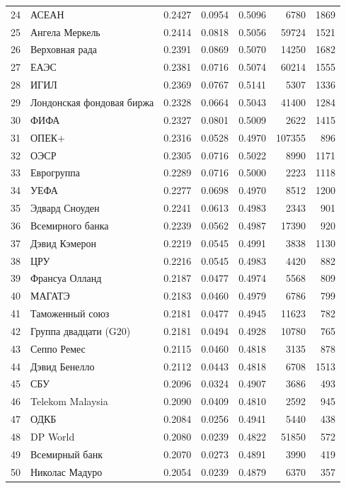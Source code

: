 {\begin{longtable}{r >{\raggedright\arraybackslash}p{4.2cm} S[table-format=1.4] S[table-format=1.4] S[table-format=1.4] r r}
24 & АСЕАН & 0.2427 & 0.0954 & 0.5096 & 6780 & 1869 \\
25 & Ангела Меркель & 0.2414 & 0.0818 & 0.5056 & 59724 & 1521 \\
26 & Верховная рада & 0.2391 & 0.0869 & 0.5070 & 14250 & 1682 \\
27 & ЕАЭС & 0.2381 & 0.0716 & 0.5074 & 60214 & 1555 \\
28 & ИГИЛ & 0.2369 & 0.0767 & 0.5141 & 5307 & 1336 \\
29 & Лондонская фондовая биржа & 0.2328 & 0.0664 & 0.5043 & 41400 & 1284 \\
30 & ФИФА & 0.2327 & 0.0801 & 0.5009 & 2622 & 1415 \\
31 & ОПЕК+ & 0.2316 & 0.0528 & 0.4970 & 107355 & 896 \\
32 & ОЭСР & 0.2305 & 0.0716 & 0.5022 & 8990 & 1171 \\
33 & Еврогруппа & 0.2289 & 0.0716 & 0.5000 & 2223 & 1118 \\
34 & УЕФА & 0.2277 & 0.0698 & 0.4970 & 8512 & 1200 \\
35 & Эдвард Сноуден & 0.2241 & 0.0613 & 0.4983 & 2343 & 901 \\
36 & Всемирного банка & 0.2239 & 0.0562 & 0.4987 & 17390 & 920 \\
37 & Дэвид Кэмерон & 0.2219 & 0.0545 & 0.4991 & 3838 & 1130 \\
38 & ЦРУ & 0.2216 & 0.0545 & 0.4983 & 4420 & 882 \\
39 & Франсуа Олланд & 0.2187 & 0.0477 & 0.4974 & 5568 & 809 \\
40 & МАГАТЭ & 0.2183 & 0.0460 & 0.4979 & 6786 & 799 \\
41 & Таможенный союз & 0.2181 & 0.0477 & 0.4945 & 11623 & 782 \\
42 & Группа двадцати (G20) & 0.2181 & 0.0494 & 0.4928 & 10780 & 765 \\
43 & Сеппо Ремес & 0.2115 & 0.0460 & 0.4818 & 3135 & 878 \\
44 & Дэвид Бенелло & 0.2112 & 0.0443 & 0.4818 & 6708 & 1513 \\
45 & СБУ & 0.2096 & 0.0324 & 0.4907 & 3686 & 493 \\
46 & Telekom Malaysia & 0.2090 & 0.0409 & 0.4810 & 2592 & 945 \\
47 & ОДКБ & 0.2084 & 0.0256 & 0.4941 & 5440 & 438 \\
48 & DP World & 0.2080 & 0.0239 & 0.4822 & 51850 & 572 \\
49 & Всемирный банк & 0.2070 & 0.0273 & 0.4891 & 3990 & 419 \\
50 & Николас Мадуро & 0.2054 & 0.0239 & 0.4879 & 6370 & 357 \\
\end{longtable}
}

